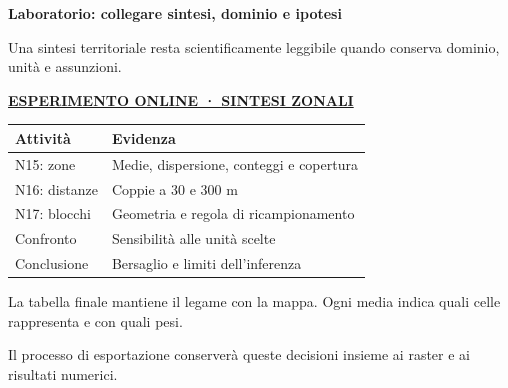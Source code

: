 \documentclass[12pt,aspectratio=1610]{beamer}
\newcommand{\PBody}[1]{\par{\fontsize{11.3}{14.8}\selectfont #1\par}}
\newcommand{\PSmall}[1]{\par{\fontsize{9.8}{13.1}\selectfont #1\par}}
\newcommand{\PInfo}[1]{%
\begin{tcolorbox}[enhanced,arc=1.6mm,boxrule=.55pt,colback=GeoTint,
 colframe=Rule!80!Classical,left=2.3mm,right=2.3mm,top=2mm,bottom=2mm,
 before skip=1mm,after skip=1mm]
\PSmall{#1}\end{tcolorbox}}
\newcommand{\PLab}[2]{\par{\color{Classical}\bfseries\fontsize{9}{11}\selectfont
\href{#1}{\MakeUppercase{#2}}}\par\vspace{1.8mm}}
\begin{document}
\begin{frame}[plain]\hypertarget{slide102}{}
\begin{lrbox}{\TitleBox}
\begin{minipage}[t]{17.7cm}\raggedright\color{Ink}\fontsize{11.3}{14.8}\selectfont
\color{Navy}\bfseries\fontsize{20.6}{24.5}\selectfont Laboratorio: collegare sintesi, dominio e ipotesi
\end{minipage}\end{lrbox}

\begin{lrbox}{\RecallBox}
\begin{minipage}[t]{14.3cm}\raggedright\color{Ink}\fontsize{11.3}{14.8}\selectfont
\fontsize{10.3}{13.8}\selectfont Una sintesi territoriale resta scientificamente leggibile quando conserva dominio, unità e assunzioni.
\end{minipage}\end{lrbox}

\begin{lrbox}{\PilotLeftBox}
\begin{minipage}[t]{10.05cm}\raggedright\color{Ink}\fontsize{11.3}{14.8}\selectfont
\PLab{https://marzione00.github.io/Lab_Geo/\#laboratorio/m12-zone}{Esperimento online · sintesi zonali}
{\fontsize{10.2}{13.1}\selectfont\renewcommand{\arraystretch}{1.45}\begin{tabular}{@{}p{4.1cm}p{4.9cm}@{}}\toprule
\textbf{Attività} & \textbf{Evidenza}\\\midrule
N15: zone & Medie, dispersione, conteggi e copertura\\
N16: distanze & Coppie a 30 e 300 m\\
N17: blocchi & Geometria e regola di ricampionamento\\
Confronto & Sensibilità alle unità scelte\\
Conclusione & Bersaglio e limiti dell’inferenza\\
\bottomrule\end{tabular}}

\end{minipage}\end{lrbox}

\begin{lrbox}{\PilotRightBox}
\begin{minipage}[t]{7.55cm}\raggedright\color{Ink}\fontsize{11.3}{14.8}\selectfont
\PBody{La tabella finale mantiene il legame con la mappa. Ogni media indica quali celle rappresenta e con quali pesi.}
\vspace{2.5mm}
\PInfo{Il processo di esportazione conserverà queste decisioni insieme ai raster e ai risultati numerici.}


\end{minipage}
\end{lrbox}
\end{frame}
\end{document}
